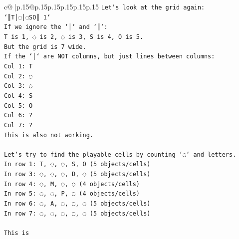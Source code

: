 \documentclass{article}
\begin{document}
{\begin{supertabular}{c@{$\;$}|p{.15\linewidth}@{}p{.15\linewidth}p{.15\linewidth}p{.15\linewidth}p{.15\linewidth}p{.15\linewidth}}
{{{\texttt{Let's look at the grid again:} \\
\texttt{`║T│◌│◌SO║ 1`} \\
\texttt{If we ignore the `│` and `║`:} \\
\texttt{T is 1, ◌ is 2, ◌ is 3, S is 4, O is 5.} \\
\texttt{But the grid is 7 wide.} \\
\texttt{If the `│` are NOT columns, but just lines between columns:} \\
\texttt{Col 1: T} \\
\texttt{Col 2: ◌} \\
\texttt{Col 3: ◌} \\
\texttt{Col 4: S} \\
\texttt{Col 5: O} \\
\texttt{Col 6: ?} \\
\texttt{Col 7: ?} \\
\texttt{This is also not working.} \\
\\ 
\texttt{Let's try to find the playable cells by counting `◌` and letters.} \\
\texttt{In row 1: T, ◌, ◌, S, O (5 objects/cells)} \\
\texttt{In row 3: ◌, ◌, ◌, D, ◌ (5 objects/cells)} \\
\texttt{In row 4: ◌, M, ◌, ◌ (4 objects/cells)} \\
\texttt{In row 5: ◌, ◌, P, ◌ (4 objects/cells)} \\
\texttt{In row 6: ◌, A, ◌, ◌, ◌ (5 objects/cells)} \\
\texttt{In row 7: ◌, ◌, ◌, ◌, ◌ (5 objects/cells)} \\
\\ 
\texttt{This is} \\
            }
        }
    }
     \\ \\


\end{supertabular}}
\end{document}
